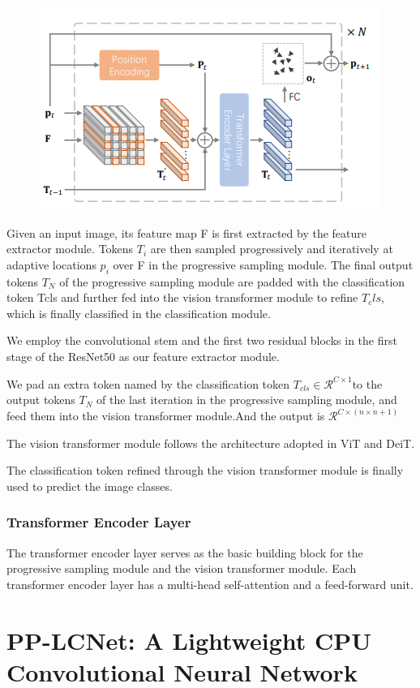 \documentclass[11pt]{article}
\begin{document}
\begin{figure}[h]
	\centering
	\includegraphics[scale = 0.7]{3}
\end{figure}
Given an input image, its feature map F is first extracted by the feature extractor module. Tokens $T_i$ are then sampled progressively and iteratively at adaptive locations $p_i$ over F in the progressive sampling module. The final output tokens $T_N$ of the progressive sampling module are padded with the classification token Tcls and further fed into the vision transformer module to refine $T_cls$, which is finally classified in the classification module.

We employ the convolutional stem and the first two residual blocks in the first stage of the ResNet50 as our feature extractor module.

We pad an extra token named by the classification token $T_{cls} \in \mathcal{R}^{C\times 1}$to the output tokens $T_N$ of the last iteration in the progressive sampling module, and feed them into the vision transformer module.And the output is $\mathcal{R}^{C\times (n\times n +1)}$

The vision transformer module follows the architecture adopted in ViT and DeiT.

The classification token refined through the vision transformer module is finally used to predict the image classes.
\subsubsection{Transformer Encoder Layer}
The transformer encoder layer serves as the basic building block for the progressive sampling module and the vision transformer module. Each transformer encoder layer has a multi-head self-attention and a feed-forward unit.

\section{PP-LCNet: A Lightweight CPU Convolutional Neural Network}
\end{document}
